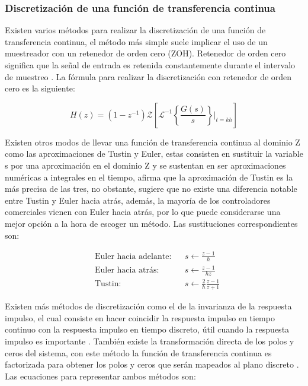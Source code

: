         \subsubsection{Discretización de una función de transferencia continua}
            
            Existen varios métodos para realizar la discretización de una función de transferencia continua, el método más simple suele implicar el uso de un muestreador con un retenedor de orden cero (ZOH). Retenedor de orden cero significa que la señal de entrada es retenida constantemente durante el intervalo de muestreo \Parencite{haugen2005discrete}. La fórmula para realizar la discretización con retenedor de orden cero es la siguiente:

            \begin{equation}\label{eq:ZOH}
                H(z) = (1 - z^{-1}) \mathcal{Z} \left[ \mathcal{L}^{-1}\left\lbrace \frac{G(s)}{s}\right\rbrace\Bigr|_{t=kh}\right]
            \end{equation}

            Existen otros modos de llevar una función de transferencia continua al dominio Z como las aproximaciones de Tustin y Euler, estas consisten en sustituir la variable s por una aproximación en el dominio Z y se sustentan en ser aproximaciones numéricas a integrales en el tiempo, \textcite{haugen2005discrete} afirma que la aproximación de Tustin es la más precisa de las tres, no obstante, sugiere que no existe una diferencia notable entre Tustin y Euler hacia atrás, además, la mayoría de los controladores comerciales vienen con Euler hacia atrás, por lo que puede considerarse una mejor opción a la hora de escoger un método. Las sustituciones correspondientes son:

            \begin{align}
                &\text{Euler hacia adelante:}& &s \leftarrow \frac{z - 1}{h} \label{eq:eulerF}\\
                &\text{Euler hacia atrás:}& &s \leftarrow \frac{z - 1}{hz} \label{eq:eulerB}\\
                &\text{Tustin:}& &s \leftarrow \frac{2}{h} \frac{z-1}{z+1} \label{eq:tustin}
            \end{align}

            Existen más métodos de discretización como el de la invarianza de la respuesta impulso, el cual consiste en hacer coincidir la respuesta impulso en tiempo continuo con la respuesta impulso en tiempo discreto, útil cuando la respuesta impulso es importante \Parencite{fernandez2013control}. También existe la transformación directa de los polos y ceros del sistema, con este método la función de transferencia continua es factorizada para obtener los polos y ceros que serán mapeados al plano discreto \Parencite{hori1992matched}. Las ecuaciones para representar ambos métodos son:


